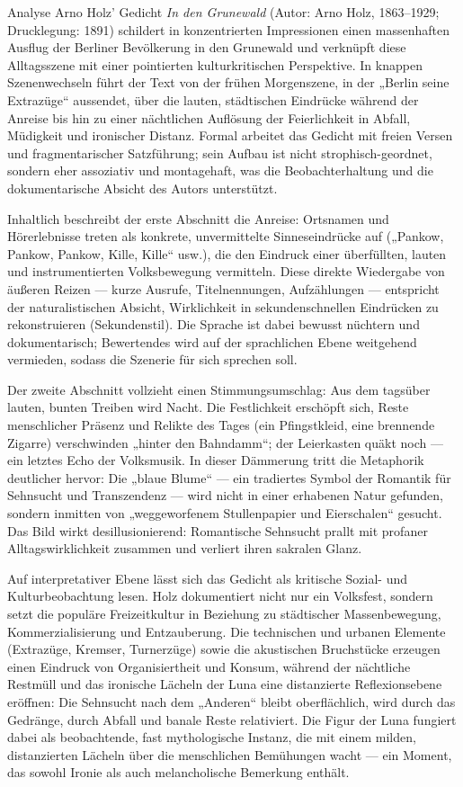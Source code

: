 \documentclass[11pt,a4paper,oneside]{article}
\begin{document}
	\begin{loesung}{Analyse}
		Arno Holz’ Gedicht \textit{In den Grunewald} (Autor: Arno Holz, 1863–1929; Drucklegung: 1891) schildert in konzentrierten Impressionen einen massenhaften Ausflug der Berliner Bevölkerung in den Grunewald und verknüpft diese Alltagsszene mit einer pointierten kulturkritischen Perspektive. In knappen Szenenwechseln führt der Text von der frühen Morgenszene, in der „Berlin seine Extrazüge“ aussendet, über die lauten, städtischen Eindrücke während der Anreise bis hin zu einer nächtlichen Auflösung der Feierlichkeit in Abfall, Müdigkeit und ironischer Distanz. Formal arbeitet das Gedicht mit freien Versen und fragmentarischer Satzführung; sein Aufbau ist nicht strophisch-geordnet, sondern eher assoziativ und montagehaft, was die Beobachterhaltung und die dokumentarische Absicht des Autors unterstützt.
		
		Inhaltlich beschreibt der erste Abschnitt die Anreise: Ortsnamen und Hörerlebnisse treten als konkrete, unvermittelte Sinneseindrücke auf („Pankow, Pankow, Pankow, Kille, Kille“ usw.), die den Eindruck einer überfüllten, lauten und instrumentierten Volksbewegung vermitteln. Diese direkte Wiedergabe von äußeren Reizen — kurze Ausrufe, Titelnennungen, Aufzählungen — entspricht der naturalistischen Absicht, Wirklichkeit in sekundenschnellen Eindrücken zu rekonstruieren (Sekundenstil). Die Sprache ist dabei bewusst nüchtern und dokumentarisch; Bewertendes wird auf der sprachlichen Ebene weitgehend vermieden, sodass die Szenerie für sich sprechen soll.
		
		Der zweite Abschnitt vollzieht einen Stimmungsumschlag: Aus dem tagsüber lauten, bunten Treiben wird Nacht. Die Festlichkeit erschöpft sich, Reste menschlicher Präsenz und Relikte des Tages (ein Pfingstkleid, eine brennende Zigarre) verschwinden „hinter den Bahndamm“; der Leierkasten quäkt noch — ein letztes Echo der Volksmusik. In dieser Dämmerung tritt die Metaphorik deutlicher hervor: Die „blaue Blume“ — ein tradiertes Symbol der Romantik für Sehnsucht und Transzendenz — wird nicht in einer erhabenen Natur gefunden, sondern inmitten von „weggeworfenem Stullenpapier und Eierschalen“ gesucht. Das Bild wirkt desillusionierend: Romantische Sehnsucht prallt mit profaner Alltagswirklichkeit zusammen und verliert ihren sakralen Glanz.
		
		Auf interpretativer Ebene lässt sich das Gedicht als kritische Sozial- und Kulturbeobachtung lesen. Holz dokumentiert nicht nur ein Volksfest, sondern setzt die populäre Freizeitkultur in Beziehung zu städtischer Massenbewegung, Kommerzialisierung und Entzauberung. Die technischen und urbanen Elemente (Extrazüge, Kremser, Turnerzüge) sowie die akustischen Bruchstücke erzeugen einen Eindruck von Organisiertheit und Konsum, während der nächtliche Restmüll und das ironische Lächeln der Luna eine distanzierte Reflexionsebene eröffnen: Die Sehnsucht nach dem „Anderen“ bleibt oberflächlich, wird durch das Gedränge, durch Abfall und banale Reste relativiert. Die Figur der Luna fungiert dabei als beobachtende, fast mythologische Instanz, die mit einem milden, distanzierten Lächeln über die menschlichen Bemühungen wacht — ein Moment, das sowohl Ironie als auch melancholische Bemerkung enthält.
		

\end{loesung}
\end{document}
